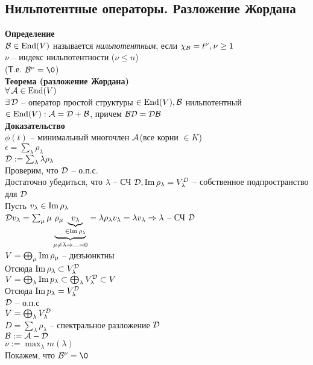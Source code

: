 \documentclass[12pt]{article}
\begin{document}
\subsection{Нильпотентные операторы. Разложение Жордана}
\textbf{Определение}\\
$\mcB \in \nm{End}(V)$ называется \textit{нильпотентным}, если $\chi_\mcB = t^\nu, \nu \geq 1$\\
$\nu$ -- индекс нильпотентности ($\nu \leq n$)\\
(Т.е. $\mcB^\nu = \0$)\\
\textbf{Теорема (разложение Жордана)}\\
$\fall \mcA \in \nm{End}(V)$\\
$\ex \mc{D}$ -- оператор простой структуры $\in \nm{End}(V), \mcB$ нильпотентный $\in \nm{End}(V): \mcA = \mc D + \mcB$, причем $\mcB \mc D = \mc D \mcB$\\
\textbf{Доказательство}\\
$\phi(t)$ -- минимальный многочлен $\mcA$(все корни $\in K$)\\
$\epsilon = \sum_\lambda \rho_\lambda$\\
$\mcD:= \sum_\lambda \lambda \rho_\lambda$\\
Проверим, что $\mcD$ -- о.п.с.\\
Достаточно убедиться, что $\lambda$ -- СЧ $\mcD, \im \rho_\lambda = V_\lambda^D$ -- собственное подпространство для $\mcD$\\
Пусть $v_\lambda \in \im \rho_\lambda$\\
$\mcD v_\lambda = \sum_\mu \mu \ub{\mu \neq \lambda \Rto \ldots = 0}{\rho_\mu \ub{\in \im \rho_\lambda}{v_\lambda}} = \lambda \rho_\lambda v_\lambda = \lambda v_\lambda \Rto \lambda$ -- СЧ $\mcD$\\
$V = \bigoplus_\mu \im \rho_\mu$ -- дизъюнктны\\
Отсюда $\im \rho_\lambda \subset V_\lambda^\mcD$\\
$V = \bigoplus_\lambda \im p_\lambda \subset \bigoplus_\lambda V_\lambda^\mcD \subset V$\\
Отсюда $\im p_\lambda = V_\lambda^\mcD$\\
$\mcD$ -- о.п.с\\
$V = \bigoplus_\lambda V_\lambda^\mcD$\\
$D = \sum_\lambda \rho_\lambda$ -- спектральное разложение $\mcD$\\
$\mcB := \mcA - \mcD$\\
$\nu := \max_\lambda m(\lambda)$\\
Покажем, что $\mcB^\nu = \0$\\
\end{document}
